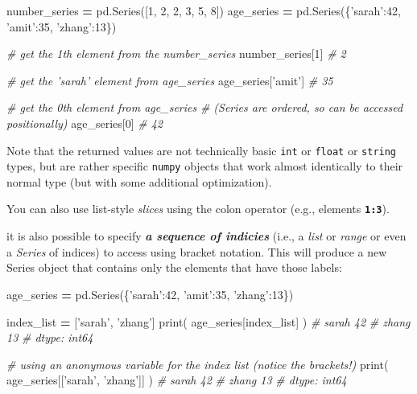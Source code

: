 \documentclass[]{book}
\newenvironment{Shaded}{\begin{snugshade}}{\end{snugshade}}
\newcommand{\DecValTok}[1]{\textcolor[rgb]{0.00,0.00,0.81}{#1}}
\newcommand{\StringTok}[1]{\textcolor[rgb]{0.31,0.60,0.02}{#1}}
\newcommand{\CommentTok}[1]{\textcolor[rgb]{0.56,0.35,0.01}{\textit{#1}}}
\newcommand{\OperatorTok}[1]{\textcolor[rgb]{0.81,0.36,0.00}{\textbf{#1}}}
\newcommand{\BuiltInTok}[1]{#1}
\newcommand{\NormalTok}[1]{#1}
\begin{document}
\begin{Shaded}
\begin{Highlighting}[]
\NormalTok{number_series }\OperatorTok{=}\NormalTok{ pd.Series([}\DecValTok{1}\NormalTok{, }\DecValTok{2}\NormalTok{, }\DecValTok{2}\NormalTok{, }\DecValTok{3}\NormalTok{, }\DecValTok{5}\NormalTok{, }\DecValTok{8}\NormalTok{])}
\NormalTok{age_series }\OperatorTok{=}\NormalTok{ pd.Series(\{}\StringTok{'sarah'}\NormalTok{:}\DecValTok{42}\NormalTok{, }\StringTok{'amit'}\NormalTok{:}\DecValTok{35}\NormalTok{, }\StringTok{'zhang'}\NormalTok{:}\DecValTok{13}\NormalTok{\})}

\CommentTok{# get the 1th element from the number_series}
\NormalTok{number_series[}\DecValTok{1}\NormalTok{]  }\CommentTok{# 2}

\CommentTok{# get the 'sarah' element from age_series}
\NormalTok{age_series[}\StringTok{'amit'}\NormalTok{]  }\CommentTok{# 35}

\CommentTok{# get the 0th element from age_series}
\CommentTok{# (Series are ordered, so can be accessed positionally)}
\NormalTok{age_series[}\DecValTok{0}\NormalTok{]  }\CommentTok{# 42}
\end{Highlighting}
\end{Shaded}

Note that the returned values are not technically basic \texttt{int} or
\texttt{float} or \texttt{string} types, but are rather specific
\texttt{numpy} objects that work almost identically to their normal type
(but with some additional optimization).

You can also use list-style \emph{slices} using the colon operator
(e.g., elements \textbf{\texttt{1:3}}).

it is also possible to specify \textbf{\emph{a sequence of indicies}}
(i.e., a \emph{list} or \emph{range} or even a \emph{Series} of indices)
to access using bracket notation. This will produce a new Series object
that contains only the elements that have those labels:

\begin{Shaded}
\begin{Highlighting}[]
\NormalTok{age_series }\OperatorTok{=}\NormalTok{ pd.Series(\{}\StringTok{'sarah'}\NormalTok{:}\DecValTok{42}\NormalTok{, }\StringTok{'amit'}\NormalTok{:}\DecValTok{35}\NormalTok{, }\StringTok{'zhang'}\NormalTok{:}\DecValTok{13}\NormalTok{\})}

\NormalTok{index_list }\OperatorTok{=}\NormalTok{ [}\StringTok{'sarah'}\NormalTok{, }\StringTok{'zhang'}\NormalTok{]}
\BuiltInTok{print}\NormalTok{( age_series[index_list] )}
    \CommentTok{# sarah    42}
    \CommentTok{# zhang    13}
    \CommentTok{# dtype: int64}

\CommentTok{# using an anonymous variable for the index list (notice the brackets!)}
\BuiltInTok{print}\NormalTok{( age_series[[}\StringTok{'sarah'}\NormalTok{, }\StringTok{'zhang'}\NormalTok{]] )}
    \CommentTok{# sarah    42}
    \CommentTok{# zhang    13}
    \CommentTok{# dtype: int64}
\end{Highlighting}
\end{Shaded}
\end{document}
